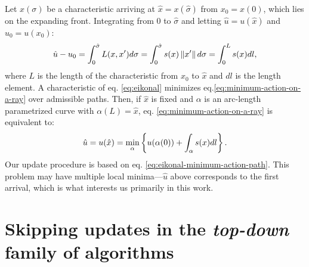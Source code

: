 \documentclass[smallcondensed]{svjour3}
\begin{document}
Let $x(\sigma)$ be a characteristic arriving at
$\hat{x} = x(\hat\sigma)$ from $x_0 = x(0)$, which lies on the
expanding front. Integrating from $0$ to $\hat\sigma$ and letting
$\hat u = u(\hat x)$ and $u_0 = u(x_0)$:
\begin{equation}
  \label{eq:minimum-action-on-a-ray}
  \hat u - u_0 = \int_{0}^{\hat\sigma} L(x, x') d\sigma = \int_{0}^{\hat\sigma} s(x) \left\|x'\right\| d\sigma = \int_0^L s(x) dl,
\end{equation}
where $L$ is the length of the characteristic from $x_0$ to $\hat{x}$
and $dl$ is the length element. A characteristic of eq.\@
\ref{eq:eikonal} minimizes eq.\@ \ref{eq:minimum-action-on-a-ray}
over admissible paths. Then, if $\hat{x}$ is fixed and $\alpha$ is an
arc-length parametrized curve with $\alpha(L) = \hat{x}$, eq.\@
\ref{eq:minimum-action-on-a-ray} is equivalent to:
\begin{equation}\label{eq:eikonal-minimum-action-path}
  \hat{u} = u(\hat{x}) = \min_\alpha \left\{u(\alpha(0)) + \int_\alpha s(x) dl\right\}.
\end{equation}
Our update procedure is based on eq.\@
\ref{eq:eikonal-minimum-action-path}. This problem may have multiple
local minima---$\hat{u}$ above corresponds to the first arrival, which
is what interests us primarily in this work.

\section{Skipping updates in the \emph{top-down} family of
  algorithms}\label{sec:kkt-skipping}
\end{document}
